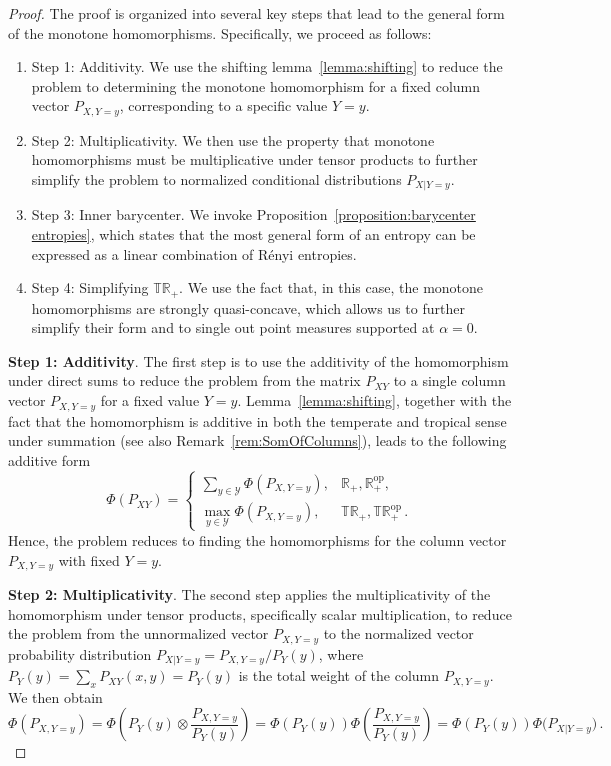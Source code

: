 \documentclass[aps,pra,11pt,onecolumn,nofootinbib,tightenlines]{revtex4-2}
\theoremstyle{definition}
\newcommand{\Y}{\mathcal{Y}}
\begin{document}
\begin{proof}
The proof is organized into several key steps that lead to the general form of the monotone homomorphisms. Specifically, we proceed as follows:
\begin{enumerate}
    \item Step 1: Additivity. We use the shifting lemma~\ref{lemma:shifting} to reduce the problem to determining the monotone homomorphism for a fixed column vector \( P_{X,Y=y} \), corresponding to a specific value \( Y = y \).
    \item Step 2: Multiplicativity. We then use the property that monotone homomorphisms must be multiplicative under tensor products to further simplify the problem to normalized conditional distributions \( P_{X|Y=y} \).
    \item Step 3: Inner barycenter. We invoke Proposition~\ref{proposition:barycenter entropies}, which states that the most general form of an entropy can be expressed as a linear combination of Rényi entropies.
     \item Step 4: Simplifying $\mathbb{TR}_+$. We use the fact that, in this case, the monotone homomorphisms are strongly quasi-concave, which allows us to further simplify their form and to single out point measures supported at $\alpha=0$.
\end{enumerate}

\bigskip
\bigskip


\noindent\textbf{Step 1: Additivity}. The first step is to use the additivity of the homomorphism under direct sums to reduce the problem from the matrix $P_{XY}$ to a single column vector $P_{X,Y=y}$ for a fixed value $Y = y$.
Lemma~\ref{lemma:shifting}, together with the fact that the homomorphism is additive in both the temperate and tropical sense under summation (see also Remark~\ref{rem:SomOfColumns}), leads to the following additive form
\begin{equation}\label{eq:additivity}
\Phi(P_{XY}) =
\begin{cases}
\sum_{y \in \Y} \Phi(P_{X,Y=y}), & \mathbb{R}_+,\mathbb{R}_+^{\mathrm{op}}, \\
\max_{y \in \Y} \Phi(P_{X,Y=y}), & \mathbb{TR}_+,\mathbb{TR}_+^{\mathrm{op}} \,.
\end{cases}
\end{equation}
Hence, the problem reduces to finding the homomorphisms for the column vector $P_{X,Y=y}$ with fixed $Y=y$.

\bigskip
\bigskip
 \noindent\textbf{Step 2: Multiplicativity}. The second step applies the multiplicativity of the homomorphism under tensor products, specifically scalar multiplication, to reduce the problem from the unnormalized vector $P_{X,Y=y}$ to the normalized vector probability distribution $P_{X|Y=y} = P_{X,Y=y}/P_Y(y)$, where $P_Y(y) = \sum_x P_{XY}(x,y) = P_Y(y)$ is the total weight of the column $P_{X,Y=y}$. We then obtain
 \begin{equation}\label{eq:normalize}
     \Phi(P_{X,Y=y}) = \Phi\left(P_Y(y) \otimes \frac{P_{X,Y=y}}{P_Y(y)}\right) =\Phi(P_Y(y)) \Phi\left(\frac{P_{X,Y=y}}{P_Y(y)}\right) = \Phi(P_Y(y)) \Phi\big(P_{X|Y=y}\big) \,.
 \end{equation}


\end{proof}
\end{document}
